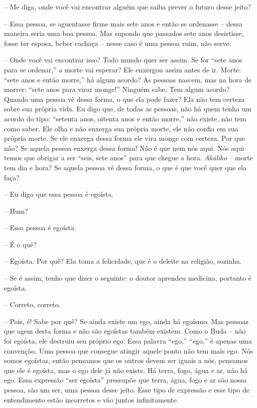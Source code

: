 -- Me diga, onde você vai encontrar alguém que saiba prever o
futuro desse jeito?

-- Essa pessoa, se aguentasse firme mais sete anos e então se
ordenasse – dessa maneira seria uma boa pessoa. Mas supondo que
passados sete anos desistisse, fosse ter esposa, beber cachaça – nesse
caso é uma pessoa ruim, não serve.

-- Onde você vai encontrar isso? Todo mundo quer ser assim. Se for
“sete anos para se ordenar,” a morte vai esperar? Ele enxergou assim
antes de ir. Morte: “sete anos e então morre,” há algum acordo? As
pessoas nascem, mas na hora de morrer: “sete anos para virar monge!”
Ninguém sabe. Tem algum acordo? Quando uma pessoa vê dessa forma, o que
ela pode fazer? Ela não tem certeza sobre sua própria vida. Eu digo
que, de todas as pessoas, não há quem tenha um acordo do tipo: “setenta
anos, oitenta anos e então morre,” não existe, não tem como saber. Ele
olha e não enxerga sua própria morte, ele não confia em sua própria
morte. Se ele enxerga dessa forma ele vira monge com certeza. Por que
não? Se aquela pessoa enxerga dessa forma! Não é que nem nós aqui. Nós
aqui temos que obrigar a ser “seis, sete anos” para que chegue a hora.
\emph{Akāliko} – morte tem dia e hora? Se aquela pessoa vê dessa
forma, o que é que você quer que ela faça? 

-- Eu digo que essa pessoa é egoísta. 

-- Hum?

-- Essa pessoa é egoísta.

-- É o quê?

-- Egoísta. Por quê? Ela toma a felicidade, que é o deleite na
religião, sozinha. 

-- Se é assim, tenho que dizer o seguinte: o doutor aprendeu
medicina, portanto é egoísta.

-- Correto, correto.

-- Pois, é! Sabe por quê? Se ainda existe um ego, ainda há egoísmo.
Mas pessoas que agem desta forma e não são egoístas também existem.
Como o Buda – não foi egoísta, ele destruiu seu próprio ego. Essa
palavra “ego,” “ego,” é apenas uma convenção. Uma pessoa que consegue
atingir aquele ponto não tem mais ego. Nós somos egoístas, então
pensamos que os outros devem ser iguais a nós, pensamos que ele é
egoísta, mas o ego dele já não existe. Há terra, fogo, água e ar, não
há ego. Essa expressão “ser egoísta” pressupõe que terra, água, fogo e
ar são nossa pessoa, são um ser, uma pessoa desse jeito. Esse tipo de
expressão e esse tipo de entendimento estão incorretos e vão juntos
infinitamente. 

